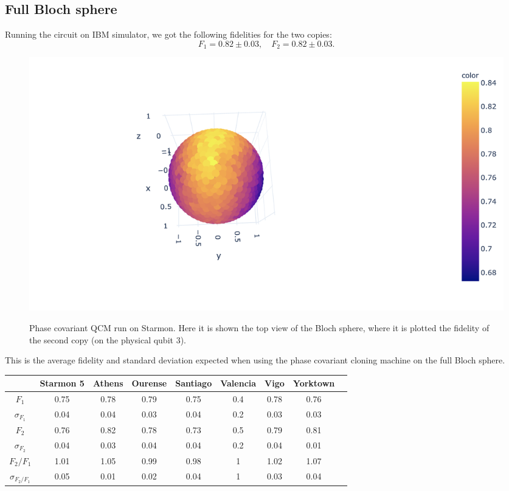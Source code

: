 \documentclass[11pt]{article}
\begin{document}
\subsection{Full Bloch sphere}
Running the circuit on IBM simulator, we got the following fidelities for the two copies:
\[
    F_1=0.82 \pm 0.03, \quad F_2=0.82 \pm 0.03.
\]
\begin{figure}[H]
    \centering
            \includegraphics[totalheight=6cm]{Figures/topviewstarmon5qubit3.png}
        \label{fig:topviewstarmon}
        \caption{Phase covariant QCM run on Starmon. Here it is shown the top view of the Bloch sphere, where it is plotted the fidelity of the second copy (on the physical qubit 3). }
\end{figure}

This is the average fidelity and standard deviation expected when using the phase covariant cloning machine on the full Bloch sphere. 
\begin{table}[H]
    \centering
    \begin{tabular}{|c|c|c|c|c|c|c|c|c|}
    \hline
    \textbf{} & \textbf{Starmon 5} & \textbf{Athens} & \textbf{Ourense} & \textbf{Santiago} & \textbf{Valencia} & \textbf{Vigo} & \textbf{Yorktown} \\ \hline
    $F_1$              & 0.75 & 0.78 & 0.79 & 0.75 & 0.4 & 0.78 & 0.76 \\ \hline
    $\sigma_{F_1}$     & 0.04 & 0.04 & 0.03 & 0.04 & 0.2 & 0.03 & 0.03 \\ \hline
    $F_2$              & 0.76 & 0.82 & 0.78 & 0.73 & 0.5 & 0.79 & 0.81 \\ \hline
    $\sigma_{F_2}$     & 0.04 & 0.03 & 0.04 & 0.04 & 0.2 & 0.04 & 0.01 \\ \hline
    $F_2/F_1$          & 1.01 & 1.05 & 0.99 & 0.98 & 1 & 1.02 & 1.07 \\ \hline
    $\sigma_{F_2/F_1}$ & 0.05 & 0.01 & 0.02 & 0.04 & 1 & 0.03 & 0.04 \\ \hline
    \end{tabular}
\end{table}
\end{document}
